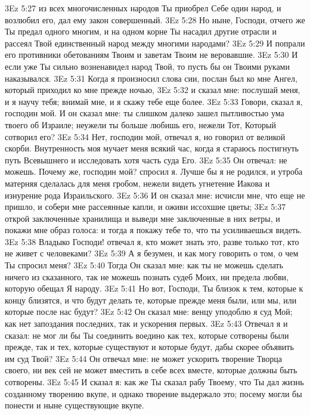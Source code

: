 \vs 3Ez 5:27 из всех многочисленных народов Ты приобрел Себе один народ, и возлюбил его, дал ему закон совершенный.
\vs 3Ez 5:28 Но ныне, Господи, отчего же Ты предал одного многим, и на одном корне Ты насадил другие отрасли и рассеял Твой единственный народ между многими народами?
\vs 3Ez 5:29 И попрали его противники обетованиям Твоим и заветам Твоим не веровавшие.
\vs 3Ez 5:30 И если уже Ты сильно возненавидел народ Твой, то пусть бы он Твоими руками наказывался.
\rsbpar\vs 3Ez 5:31 Когда я произносил слова сии, послан был ко мне Ангел, который приходил ко мне прежде ночью,
\vs 3Ez 5:32 и сказал мне: послушай меня, и я научу тебя; внимай мне, и я скажу тебе еще более.
\vs 3Ez 5:33 Говори, сказал я, господин мой. И он сказал мне: ты слишком далеко зашел пытливостью ума твоего об Израиле; неужели ты больше любишь его, нежели Тот, Который сотворил его?
\vs 3Ez 5:34 Нет, господин мой, отвечал я, но говорил от великой скорби. Внутренность моя мучает меня всякий час, когда я стараюсь постигнуть путь Всевышнего и исследовать хотя часть суда Его.
\vs 3Ez 5:35 Он отвечал: не можешь. Почему же, господин мой? спросил я. Лучше бы я не родился, и утроба матерняя сделалась для меня гробом, нежели видеть угнетение Иакова и изнурение рода Израильского.
\vs 3Ez 5:36 И он сказал мне: исчисли мне, что еще не пришло, и собери мне рассеянные капли, и оживи иссохшие цветы;
\vs 3Ez 5:37 открой заключенные хранилища и выведи мне заключенные в них ветры, и покажи мне образ голоса: и тогда я покажу тебе то, что ты усиливаешься видеть.
\vs 3Ez 5:38 Владыко Господи! отвечал я, кто может знать это, разве только тот, кто не живет с человеками?
\vs 3Ez 5:39 А я безумен, и как могу говорить о том, о чем Ты спросил меня?
\vs 3Ez 5:40 Тогда Он сказал мне: как ты не можешь сделать ничего из сказанного, так не можешь познать судеб Моих, ни предела любви, которую обещал Я народу.
\vs 3Ez 5:41 Но вот, Господи, Ты близок к тем, которые к концу близятся, и что будут делать те, которые прежде меня были, или мы, или которые после нас будут?
\vs 3Ez 5:42 Он сказал мне: венцу уподоблю я суд Мой; как нет запоздания последних, так и ускорения первых.
\vs 3Ez 5:43 Отвечал я и сказал: не мог ли бы Ты соединить воедино как тех, которые сотворены были прежде, так и тех, которые существуют и которые будут, дабы скорее объявить им суд Твой?
\vs 3Ez 5:44 Он отвечал мне: не может ускорить творение Творца своего, ни век сей не может вместить в себе всех вместе, которые должны быть сотворены.
\vs 3Ez 5:45 И сказал я: как же Ты сказал рабу Твоему, что Ты дал жизнь созданному творению вкупе, и однако творение выдержало это; посему могли бы понести и ныне существующие вкупе.
